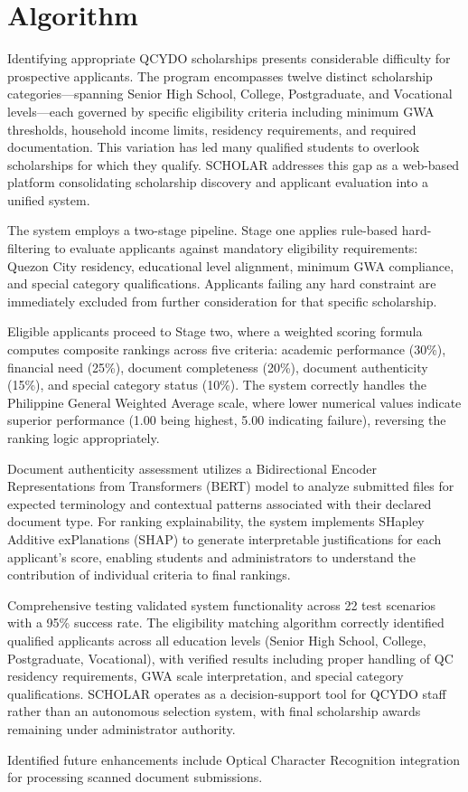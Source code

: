 \section{Algorithm}

Identifying appropriate QCYDO scholarships presents considerable difficulty for prospective applicants. The program encompasses twelve distinct scholarship categories—spanning Senior High School, College, Postgraduate, and Vocational levels—each governed by specific eligibility criteria including minimum GWA thresholds, household income limits, residency requirements, and required documentation. This variation has led many qualified students to overlook scholarships for which they qualify. SCHOLAR addresses this gap as a web-based platform consolidating scholarship discovery and applicant evaluation into a unified system.

The system employs a two-stage pipeline. Stage one applies rule-based hard-filtering to evaluate applicants against mandatory eligibility requirements: Quezon City residency, educational level alignment, minimum GWA compliance, and special category qualifications. Applicants failing any hard constraint are immediately excluded from further consideration for that specific scholarship.

Eligible applicants proceed to Stage two, where a weighted scoring formula computes composite rankings across five criteria: academic performance (30\%), financial need (25\%), document completeness (20\%), document authenticity (15\%), and special category status (10\%). The system correctly handles the Philippine General Weighted Average scale, where lower numerical values indicate superior performance (1.00 being highest, 5.00 indicating failure), reversing the ranking logic appropriately.

Document authenticity assessment utilizes a Bidirectional Encoder Representations from Transformers (BERT) model to analyze submitted files for expected terminology and contextual patterns associated with their declared document type. For ranking explainability, the system implements SHapley Additive exPlanations (SHAP) to generate interpretable justifications for each applicant's score, enabling students and administrators to understand the contribution of individual criteria to final rankings.

Comprehensive testing validated system functionality across 22 test scenarios with a 95\% success rate. The eligibility matching algorithm correctly identified qualified applicants across all education levels (Senior High School, College, Postgraduate, Vocational), with verified results including proper handling of QC residency requirements, GWA scale interpretation, and special category qualifications. SCHOLAR operates as a decision-support tool for QCYDO staff rather than an autonomous selection system, with final scholarship awards remaining under administrator authority.

Identified future enhancements include Optical Character Recognition integration for processing scanned document submissions.
